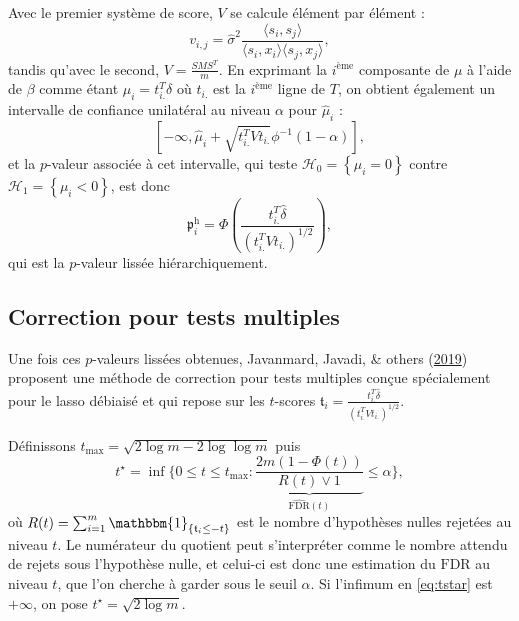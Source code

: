 \documentclass[12pt,a4paper]{reedthesis}
\newcommand \indic {\mathbbm{1}}
\newcommand \pv {\mathfrak{p}}
\newcommand \ts {\mathfrak{t}}
\newcommand \shifts {\delta}
\newcommand \optim {\beta}
\theoremstyle{definition}
\theoremstyle{definition}
\theoremstyle{definition}
\theoremstyle{remark}
\begin{document}
Avec le premier système de score, \(V\) se calcule élément par élément :
\begin{equation*}
v_{i,j} = \hat{\sigma}^2 \frac{\langle s_i,s_j\rangle}{\langle s_i,x_i\rangle\langle s_j,x_j\rangle},
\end{equation*}
tandis qu'avec le second, \(V = \frac{S M S^T }{m}\). En exprimant la \(i^{\text{ème}}\) composante de \(\mu\) à l'aide de \(\optim\) comme étant \(\mu_i = t_{i.}^T\shifts\) où \(t_{i.}\) est la \(i^{\text{ème}}\) ligne de \(T\), on obtient également un intervalle de confiance unilatéral au niveau \(\alpha\) pour \(\hat{\mu}_i\) :
\begin{equation*}
\left[-\infty, \hat{\mu}_i + \sqrt{t_{i.}^T V t_{i.}} \phi^{-1}\left(1-\alpha\right)\right],
\end{equation*}
et la \(p\)-valeur associée à cet intervalle, qui teste \(\mathcal{H}_0 = \left\{\mu_i = 0\right\}\) contre \(\mathcal{H}_1 = \left\{\mu_i < 0\right\}\), est donc
\begin{equation*}
\pv^\text{h}_i = \Phi\left(\frac{t_{i.}^T\hat{\shifts}}{\left(t_{i.}^TVt_{i.}\right)^{1/2}}\right),
\end{equation*}
qui est la \(p\)-valeur lissée hiérarchiquement.

\hypertarget{correction-pour-tests-multiples}{%
\subsection{Correction pour tests multiples}\label{correction-pour-tests-multiples}}

Une fois ces \(p\)-valeurs lissées obtenues, Javanmard, Javadi, \& others (\protect\hyperlink{ref-javanmard2019false}{2019}) proposent une méthode de correction pour tests multiples conçue spécialement pour le lasso débiaisé et qui repose sur les \(t\)-scores
\(\ts_i = \frac{t_{i.}^T\hat{\shifts}}{\left(t_{i.}^TVt_{i.}\right)^{1/2}}\).

Définissons \(t_{\text{max}} = \sqrt{2 \log m - 2 \log \log m}\) puis
\begin{equation}
\label{eq:tstar}
t^{\star} = \inf \bigg\{ 0 \leq t \leq t_{\max} : \underbrace{\frac{2m(1 - \Phi(t))}{R(t) \vee 1}}_{\widehat{\text{FDR}}(t)} \leq \alpha \bigg\},
\end{equation}
où \(R(t)= \sum_{i = 1}^m \indic_{\{\ts_i \leq -t\}}\) est le nombre d'hypothèses nulles rejetées au niveau \(t\). Le numérateur du quotient peut s'interpréter comme le nombre attendu de rejets sous l'hypothèse nulle, et celui-ci est donc une estimation du \(\text{FDR}\) au niveau \(t\), que l'on cherche à garder sous le seuil \(\alpha\). Si l'infimum en \eqref{eq:tstar} est \(+\infty\), on pose \(t^{\star} = \sqrt{2 \log m}\).
\end{document}
